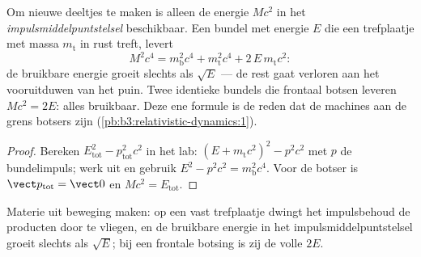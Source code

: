 \begin{proposition}\label{prop:b3:relativistic-dynamics:threshold}
Om nieuwe deeltjes te maken is alleen de energie $Mc^2$ in het
\emph{impulsmiddelpuntstelsel} beschikbaar. Een bundel met energie $E$
die een trefplaatje met massa $m_{\text{t}}$ in rust treft, levert
\[
M^2c^4 = m_{\text{b}}^2c^4 + m_{\text{t}}^2c^4 +
2\,E\,m_{\text{t}}c^2 :
\]
de bruikbare energie groeit slechts als $\sqrt E$ --- de rest gaat
verloren aan het vooruitduwen van het puin. Twee identieke bundels die
frontaal botsen leveren $Mc^2 = 2E$: alles bruikbaar. Deze ene formule is
de reden dat de machines aan de grens botsers zijn
(\cref{pb:b3:relativistic-dynamics:1}).
\end{proposition}

\begin{proof}
Bereken $E_{\text{tot}}^2 - p_{\text{tot}}^2c^2$ in het lab:
$(E + m_{\text{t}}c^2)^2 - p^2c^2$ met $p$ de bundelimpuls; werk uit en
gebruik $E^2 - p^2c^2 = m_{\text{b}}^2c^4$. Voor de botser is $\vect p_{\text{tot}} = \vect 0$ en $Mc^2 = E_{\text{tot}}$.
\end{proof}

\begin{omfigure}

{\small Materie uit beweging maken: op een vast trefplaatje dwingt het
impulsbehoud de producten door te vliegen, en de bruikbare energie in het
impulsmiddelpuntstelsel groeit slechts als $\sqrt E$; bij een frontale
botsing is zij de volle $2E$.}
\end{omfigure}

